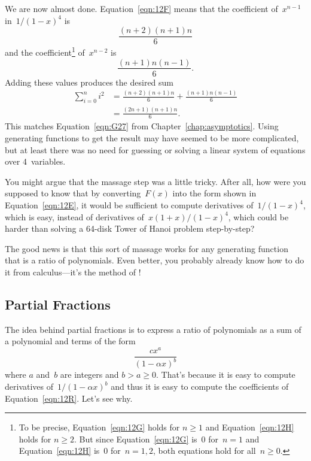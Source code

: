 We are now almost done.  Equation~\ref{eqn:12F} means that the
coefficient of~$x^{n - 1}$ in~$1/(1 - x)^4$ is
\begin{equation}\label{eqn:12G}
    \frac{(n + 2) (n + 1) n}{6}
\end{equation}
and the coefficient\footnote{To be precise, Equation~\ref{eqn:12G}
  holds for $n \ge 1$ and Equation~\ref{eqn:12H} holds for $n \ge 2$.
  But since Equation~\ref{eqn:12G} is~0 for~$n = 1$ and
  Equation~\ref{eqn:12H} is~0 for~$n = 1, 2$, both equations hold for
  all~$n \ge 0$.}  of~$x^{n - 2}$ is
\begin{equation}\label{eqn:12H}
    \frac{(n + 1) n (n - 1)}{6}.
\end{equation}
Adding these values produces the desired sum
\begin{align*}
\sum_{i = 0}^n i^2
    &= \frac{(n + 2) (n + 1) n}{6} + \frac{(n + 1) n (n - 1)}{6} \\
    &= \frac{ (2n + 1) (n + 1) n }{6}.
\end{align*}
This matches Equation~\ref{eqn:G27} from
Chapter~\ref{chap:asymptotics}.  Using generating functions to get the
result may have seemed to be more complicated, but at least there was
no need for guessing or solving a linear system of equations over
4~variables.

You might argue that the massage step was a little tricky.  After all,
how were you supposed to know that by converting~$F(x)$ into the form
shown in Equation~\ref{eqn:12E}, it would be sufficient to compute
derivatives of~$1/(1 - x)^4$, which is easy, instead of derivatives
of~$x (1 + x) / (1 - x)^4$, which could be harder than solving a
64-disk Tower of Hanoi problem step-by-step?

The good news is that this sort of massage works for any generating
function that is a ratio of polynomials.  Even better, you probably
already know how to do it from calculus---it's the method of
!

\subsection{Partial Fractions}\label{sec:partial_fractions}

The idea behind partial fractions is to express a ratio of polynomials
as a sum of a polynomial and terms of the form
\begin{equation}\label{eqn:12R}
    \frac{c x^a}{(1 - \alpha x)^b}
\end{equation}
where $a$ and~$b$ are integers and $b > a \ge 0$.  That's because it
is easy to compute derivatives of~$1/(1 - \alpha x)^b$ and thus it is
easy to compute the coefficients of Equation~\ref{eqn:12R}.  Let's see
why.

